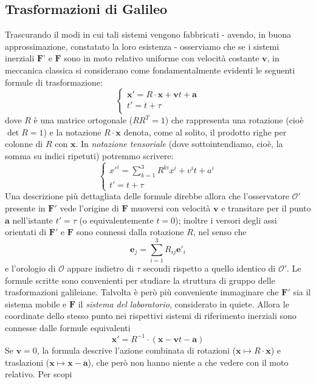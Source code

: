 \documentclass[a4paper,11pt]{book}
\theoremstyle{plain}
\theoremstyle{definition}
\begin{document}
\subsection{Trasformazioni di Galileo}
Trascurando il modi in cui tali sistemi vengono fabbricati - avendo, in buona approssimazione, constatato la loro esistenza - osserviamo che se i sistemi inerziali $\textbf{F}$' e $\textbf{F}$ sono in moto relativo uniforme con velocità costante $\textbf{v}$, in 
meccanica classica si considerano come fondamentalmente evidenti le seguenti formule di 
trasformazione:
\begin{equation}\label{eq:galileo}
\begin{cases}
\textbf{x}'=R\cdot \textbf{x}+\textbf{v}t+\textbf{a} \\
t'=t+\tau \\
\end{cases}
\end{equation}
dove $R$ è una matrice ortogonale ($RR^T = 1$) che rappresenta una rotazione (cioè $\det R=1$) e la notazione 
$R\cdot \textbf{x}$ denota, come al solito, il prodotto righe per colonne di $R$ con $\textbf{x}$. In \emph{notazione tensoriale} (dove sottointendiamo, cioè, la somma su indici ripetuti) potremmo scrivere: 
\[
\begin{cases}
x'^i = \sum_{k=1}^3 R^{ki}x^i+v^it+a^i \\
t'=t+\tau
\end{cases}
\]
Una descrizione 
più dettagliata delle formule direbbe allora che l'osservatore $\mathcal{O}'$ presente in $\textbf{F}'$ 
vede l'origine di $\textbf{F}$ muoversi con velocità $\textbf{v}$ e transitare per il punto $\textbf{a}$ nell'istante $t'= \tau$ (o equivalentemente $t = 0$); inoltre i versori degli assi orientati di $\textbf{F}'$ e $\textbf{F}$ sono connessi dalla rotazione $R$, nel senso che
\[
\textbf{e}_j = \sum_{i=1}^3 R_{ij}\textbf{e}'_i
\]  
e l'orologio di $\mathcal{O}$ appare indietro di $\tau$ secondi rispetto a quello identico di $\mathcal{O}'$. 
Le formule scritte sono convenienti per studiare la struttura di gruppo delle trasformazioni 
galileiane. Talvolta è però più conveniente immaginare che $\textbf{F}'$ sia il sistema mobile e $\textbf{F}$ il 
\emph{sistema del laboratorio}, considerato in quiete. Allora le coordinate dello stesso punto 
nei rispettivi sistemi di riferimento inerziali sono connesse dalle formule equivalenti 
\[
\textbf{x}'=R^{-1}\cdot(\textbf{x}-\textbf{v}t-\textbf{a})
\]
Se $\textbf{v} = 0$, la formula descrive l'azione combinata di rotazioni ($\textbf{x}\mapsto R \cdot \textbf{x}$) e traslazioni ($\textbf{x}\mapsto \textbf{x}-\textbf{a}$), che però non hanno niente a che vedere con il moto relativo. Per scopi 
\end{document}
